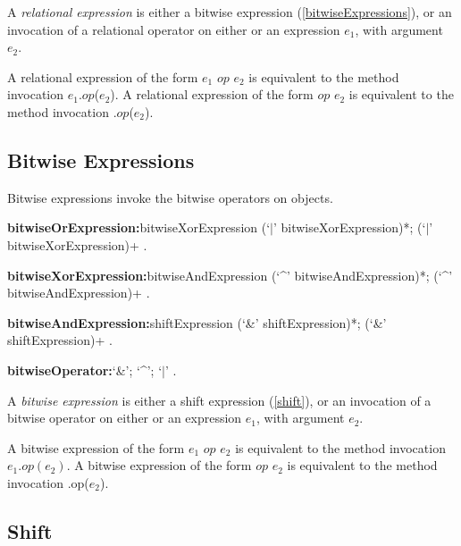 \documentclass{article}
\newcommand{\code}[1]{{\sf #1}}
\begin{document}
\LMHash{}
A {\em relational expression} is either a bitwise expression (\ref{bitwiseExpressions}), or an invocation of a relational operator on either \SUPER{} or an expression $e_1$, with argument $e_2$.
 
\LMHash{}
A relational expression of the form  $e_1$ $op$ $e_2$ is equivalent to the method invocation \code{$e_1$.$op$($e_2$)}. A relational expression of the form  \SUPER{} $op$ $e_2$ is equivalent to the method invocation \code{\SUPER{}.$op$($e_2$)}. 

\subsection{ Bitwise Expressions}

\LMHash{}
Bitwise expressions invoke the bitwise operators on objects.

 \begin{grammar}
{\bf bitwiseOrExpression:}bitwiseXorExpression (`$|$' bitwiseXorExpression)*;
      \SUPER{} (`$|$' bitwiseXorExpression)+
    .

{\bf bitwiseXorExpression:}bitwiseAndExpression (`\^{}' bitwiseAndExpression)*;
      \SUPER{} (`\^{}' bitwiseAndExpression)+
    .

{\bf bitwiseAndExpression:}shiftExpression (`\&' shiftExpression)*;
      \SUPER{} (`\&' shiftExpression)+
    .

{\bf bitwiseOperator:}`\&';
      `\^{}';
      `$|$'
    .
 \end{grammar}
 
\LMHash{}
A {\em bitwise expression} is either a shift expression (\ref{shift}), or an invocation of a bitwise operator on either \SUPER{} or an expression $e_1$, with argument $e_2$.
 
\LMHash{}
 A bitwise expression of the form  $e_1$ $op$ $e_2$ is equivalent to the method invocation $e_1.op(e_2)$.
A bitwise expression of the form  \code{\SUPER{} $op$ $e_2$} is equivalent to the method invocation \code{\SUPER{}.op($e_2$)}.


 
\subsection{ Shift}
\end{document}
